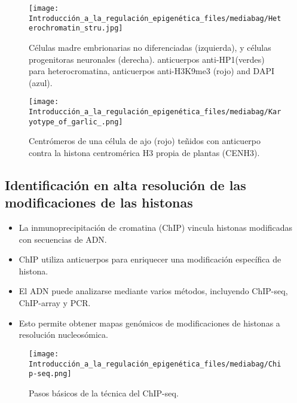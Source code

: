 \documentclass[
  letterpaper,
  DIV=11,
  numbers=noendperiod]{scrartcl}
\providecommand{\tightlist}{%
  \setlength{\itemsep}{0pt}\setlength{\parskip}{0pt}}\usepackage{longtable,booktabs,array}
\begin{document}
\begin{figure}[H]

{\centering \texttt{[image: Introducción\_a\_la\_regulación\_epigenética\_files/mediabag/Heterochromatin\_stru.jpg]}

}

\caption{Células madre embrionarias no diferenciadas (izquierda), y
células progenitoras neuronales (derecha). anticuerpos anti-HP1(verdes)
para heterocromatina, anticuerpos anti-H3K9me3 (rojo) and DAPI (azul).}

\end{figure}%
\begin{figure}[H]

{\centering \texttt{[image: Introducción\_a\_la\_regulación\_epigenética\_files/mediabag/Karyotype\_of\_garlic\_.png]}

}

\caption{Centrómeros de una célula de ajo (rojo) teñidos con anticuerpo
contra la histona centromérica H3 propia de plantas (CENH3).}

\end{figure}%

\subsection{Identificación en alta resolución de las modificaciones de
las
histonas}\label{identificaciuxf3n-en-alta-resoluciuxf3n-de-las-modificaciones-de-las-histonas}

\begin{itemize}
\tightlist
\item
  La inmunoprecipitación de cromatina (ChIP) vincula histonas
  modificadas con secuencias de ADN.
\item
  ChIP utiliza anticuerpos para enriquecer una modificación específica
  de histona.
\item
  El ADN puede analizarse mediante varios métodos, incluyendo ChIP-seq,
  ChIP-array y PCR.
\item
  Esto permite obtener mapas genómicos de modificaciones de histonas a
  resolución nucleosómica.
\end{itemize}

\begin{figure}[H]

{\centering \texttt{[image: Introducción\_a\_la\_regulación\_epigenética\_files/mediabag/Chip-seq.png]}

}

\caption{Pasos básicos de la técnica del ChIP-seq.}

\end{figure}%
\end{document}
